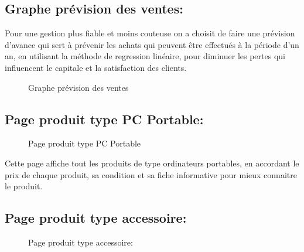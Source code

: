 \documentclass[a4paper]{report}
\begin{document}
\begin{doublespace}
\begin{doublespace}
\begin{doublespace}
\begin{doublespace}
\begin{doublespace}
                    \subsection{Graphe prévision des ventes:}
                    Pour une gestion plus fiable et moins couteuse on a
                    choisit de faire une prévision d'avance qui sert à prévenir les achats qui
                    peuvent être effectués à la période d'un an, en utilisant la méthode de
                    regression linéaire, pour diminuer les pertes qui influencent le capitale et la
                    satisfaction des clients.
                    \begin{figure}[H]
                        \begin{center}
                            \caption{Graphe prévision des ventes}
                        \end{center}
                    \end{figure}
                    \subsection{Page produit type PC Portable:}
                    \begin{figure}[H]
                        \begin{center}
                            \caption{Page produit type PC Portable}
                        \end{center}
                    \end{figure}
                    Cette page affiche tout les produits de type
                    ordinateurs portables, en accordant le prix de chaque produit, sa condition et
                    sa fiche informative pour mieux connaitre le produit.
                    \subsection{Page produit type accessoire:}
                    \begin{figure}[H]
                        \begin{center}
                            \caption{Page produit type accessoire:}
                        \end{center}
                    \end{figure}


\end{doublespace}
\end{doublespace}
\end{doublespace}
\end{doublespace}
\end{doublespace}
\end{document}
